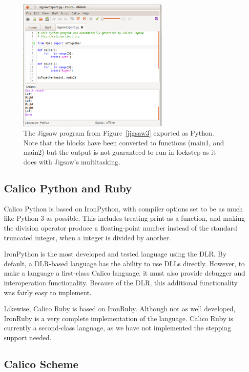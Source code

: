 \documentclass[preprint]{sigplanconf}
\begin{document}
\begin{figure}[h!]
  \centering
    \includegraphics[width=75mm]{jigsaw4.eps} 
  \caption{The Jigsaw program from Figure~\ref{jigsaw3} exported
    as Python. Note that the blocks have been converted to functions
    (main1, and main2) but the output is not guaranteed to run in
    lockstep as it does with Jigsaw's multitasking.}
  \label{jigsaw4}
\end{figure}

\subsection{Calico Python and Ruby}

Calico Python is based on IronPython, with compiler options set to be
as much like Python 3 as possible. This includes treating print as a
function, and making the division operator produce a floating-point
number instead of the standard truncated integer, when a integer is
divided by another.

IronPython is the most developed and tested language using the DLR.
By default, a DLR-based language has the ability to use DLLs
directly. However, to make a language a first-class Calico language,
it must also provide debugger and interoperation
functionality. Because of the DLR, this additional functionality was
fairly easy to implement.

Likewise, Calico Ruby is based on IronRuby. Although not as well
developed, IronRuby is a very complete implementation of the
language. Calico Ruby is currently a second-class language, as we have
not implemented the stepping support needed.

\subsection{Calico Scheme}
\end{document}
